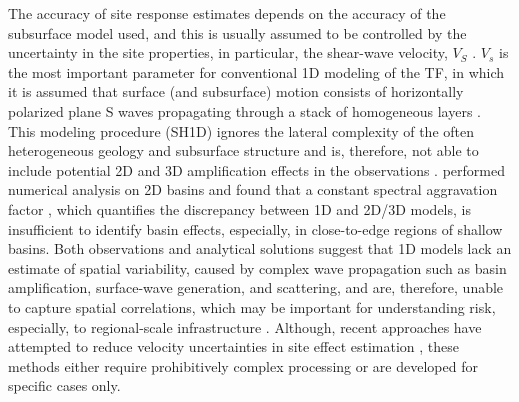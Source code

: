 The accuracy of site response estimates depends on the accuracy of the subsurface model used, and this is usually assumed to be controlled by the uncertainty in the site properties, in particular, the shear-wave velocity, $V_S$ . $V_s$ is the most important parameter for conventional 1D modeling of the TF, in which it is assumed that surface (and subsurface) motion consists of horizontally polarized plane S waves propagating through a stack of homogeneous layers . This modeling procedure (SH1D) ignores the lateral complexity of the often heterogeneous geology and subsurface structure and is, therefore, not able to include potential 2D and 3D amplification effects in the observations . \citet{zhuSeismicAggravationShallow2018} performed numerical analysis on 2D basins and found that a constant spectral aggravation factor \citep{chavez-garciaComplexSiteEffects2000}, which quantifies the discrepancy between 1D and 2D/3D models, is insufficient to identify basin effects, especially, in close-to-edge regions of shallow basins. Both observations and analytical solutions suggest that 1D models lack an estimate of spatial variability, caused by complex wave propagation such as basin amplification, surface-wave generation, and scattering, and are, therefore, unable to capture spatial correlations, which may be important for understanding risk, especially, to regional-scale infrastructure . Although, recent approaches have attempted to reduce velocity uncertainties in site effect estimation \citep{matavosicPracticesProceduresSitespecific2012,teagueMeasuredVsPredicted2018}, these methods either require prohibitively complex processing or are developed for specific cases only.

